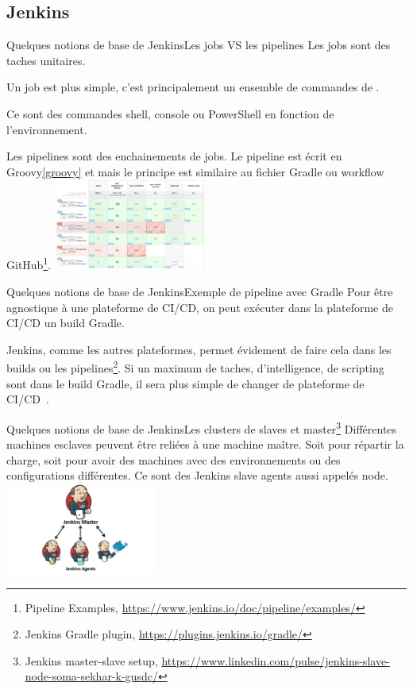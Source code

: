 \documentclass{beamer}
\begin{document}
    \subsection{Jenkins}\label{subsec:jenkins}
    \begin{frame}{Quelques notions de base de Jenkins}{Les jobs VS les pipelines}
        \transdissolve
        Les jobs sont des taches unitaires.

        Un job est plus simple, c'est principalement un ensemble de commandes de .

        Ce sont des commandes shell, console ou PowerShell en fonction de l'environnement.

        \bigbreak
        Les pipelines sont des enchainements de jobs.
        Le pipeline est écrit en Groovy\cref{groovy} et mais le principe est similaire au fichier Gradle ou workflow GitHub\footnote{Pipeline Examples, \url{https://www.jenkins.io/doc/pipeline/examples/}}.
        \bigbreak
        \centering
        \includegraphics[width=5cm]{image/jenkins-pipeline}
    \end{frame}

    \begin{frame}{Quelques notions de base de Jenkins}{Exemple de pipeline avec Gradle}
        \transdissolve
        Pour être agnostique à une plateforme de CI/CD, on peut exécuter dans la plateforme de CI/CD un build Gradle.

        Jenkins, comme les autres plateformes, permet évidement de faire cela dans les builds ou les pipelines\footnote{Jenkins Gradle plugin, \url{https://plugins.jenkins.io/gradle/}}.
        \bigbreak
        Si un maximum de taches, d'intelligence, de scripting sont dans le build Gradle, il sera plus simple de changer de plateforme de CI/CD~.
    \end{frame}

    \begin{frame}{Quelques notions de base de Jenkins}{Les clusters de slaves et master\footnote{Jenkins master-slave setup, \url{https://www.linkedin.com/pulse/jenkins-slave-node-soma-sekhar-k-gusdc/}}}
        \transdissolve
        Différentes machines esclaves peuvent être reliées à une machine maître.
        Soit pour répartir la charge, soit pour avoir des machines avec des environnements ou des configurations différentes.
        Ce sont des Jenkins slave agents aussi appelés node.
        \bigbreak
        \centering
        \includegraphics[width=5cm]{image/jenkins-cluster}
    \end{frame}
\end{document}

